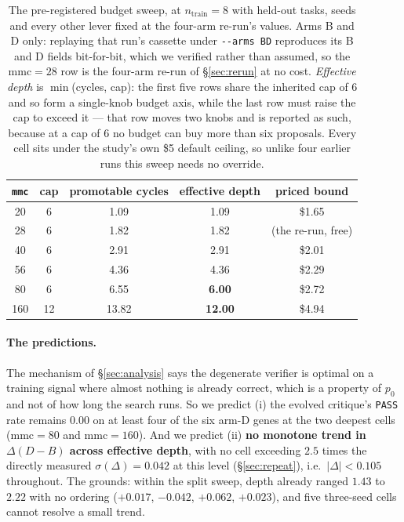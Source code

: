 \documentclass[11pt]{article}
\newcommand{\dd}{\ensuremath{\Delta}}
\begin{document}
\begin{table}[h]
\centering
\small
\begin{tabular}{ccccc}
\toprule
\texttt{mmc} & cap & promotable cycles & effective depth & priced bound \\
\midrule
20  & 6  & 1.09  & 1.09 & \$1.65 \\
28  & 6  & 1.82  & 1.82 & (the re-run, free) \\
40  & 6  & 2.91  & 2.91 & \$2.01 \\
56  & 6  & 4.36  & 4.36 & \$2.29 \\
80  & 6  & 6.55  & \textbf{6.00} & \$2.72 \\
160 & 12 & 13.82 & \textbf{12.00} & \$4.94 \\
\bottomrule
\end{tabular}
\caption{The pre-registered budget sweep, at $n_{\mathrm{train}} = 8$ with held-out tasks, seeds
and every other lever fixed at the four-arm re-run's values. Arms B and D only: replaying that
run's cassette under \texttt{-{}-arms BD} reproduces its B and D fields bit-for-bit, which we
verified rather than assumed, so the $\mathrm{mmc}{=}28$ row is the four-arm re-run of \S\ref{sec:rerun} at no cost. \emph{Effective depth} is
$\min$(cycles, cap): the first five rows share the inherited cap of $6$ and so form a
single-knob budget axis, while the last row must raise the cap to exceed it --- that row moves
two knobs and is reported as such, because at a cap of $6$ no budget can buy more than six
proposals. Every cell sits under the study's own \$5 default ceiling, so unlike four earlier runs
this sweep needs no override.}
\label{tab:budgetsweep}
\end{table}

\paragraph{The predictions.} The mechanism of \S\ref{sec:analysis} says the degenerate verifier
is optimal on a training signal where almost nothing is already correct, which is a property of
$p_0$ and not of how long the search runs. So we predict (i) the evolved critique's \texttt{PASS}
rate remains $0.00$ on at least four of the six arm-D genes at the two deepest cells
($\mathrm{mmc}{=}80$ and $\mathrm{mmc}{=}160$). And we predict (ii) \textbf{no monotone trend in
$\dd(D-B)$ across effective depth}, with no cell exceeding $2.5$ times the directly measured
$\sigma(\dd) = 0.042$ at this level (\S\ref{sec:repeat}), i.e.\ $|\dd| < 0.105$ throughout. The
grounds: within the split sweep, depth already ranged $1.43$ to $2.22$ with no ordering
($+0.017$, $-0.042$, $+0.062$, $+0.023$), and five three-seed cells cannot resolve a small trend.
\end{document}
